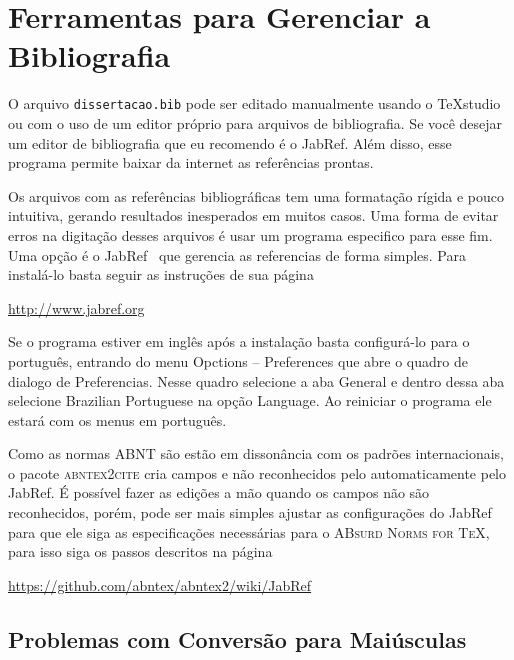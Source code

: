 \documentclass[fleqn]{profmat-cefet}
\newcommand{\TeXstudio}{\TeX\textsf{studio}}
\newcommand{\JabRef}   {\textsf{JabRef}}
\newcommand{\bibfile}  {\texttt{dissertacao.bib}}
\begin{document}
\section{Ferramentas para Gerenciar a Bibliografia}
\label{sec:ferramenta_para_gerenciar_a_bibliografia}

O arquivo \bibfile{} pode ser editado manualmente usando o 
\TeXstudio{} ou com o uso de um editor próprio para arquivos de bibliografia.
Se você desejar um editor de bibliografia que eu recomendo é o \JabRef{}.
Além disso, esse programa permite baixar da internet as referências prontas.

Os arquivos com as referências bibliográficas tem uma formatação rígida e
pouco intuitiva, gerando resultados inesperados em muitos casos. Uma forma 
de evitar erros na digitação desses arquivos é usar um programa especifico 
para esse fim. Uma opção é o \JabRef{}~\cite{JABREF} que gerencia as referencias 
de forma simples. Para instalá-lo basta seguir as instruções de sua página 
\begin{center}
    \url{http://www.jabref.org}
\end{center}
Se o programa estiver em inglês após a instalação basta configurá-lo para o 
português, entrando do menu \textsf{Opctions -- Preferences} que abre o 
quadro de dialogo de Preferencias. Nesse quadro selecione a aba \textsf{General}
e dentro dessa aba selecione \textsf{Brazilian Portuguese} na opção \textsf{Language}.
Ao reiniciar o programa ele estará com os menus em português.

Como as normas ABNT são estão em dissonância com os padrões internacionais, 
o pacote \textsc{abntex2cite} cria campos e não reconhecidos pelo automaticamente
pelo \JabRef{}. 
É possível fazer as edições a mão quando os campos não são reconhecidos,
porém, pode ser mais simples ajustar as configurações do \JabRef{} para que
ele siga as especificações necessárias para o \textsc{ABsurd Norms for TeX},
para isso siga os passos descritos na página
\begin{center}
    \url{https://github.com/abntex/abntex2/wiki/JabRef}
\end{center}

\subsection{Problemas com Conversão para Maiúsculas}
\end{document}
